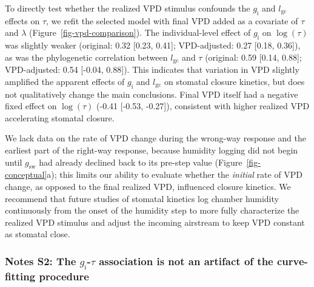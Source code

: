 \documentclass[
  letterpaper,
  DIV=11,
  numbers=noendperiod]{scrartcl}
\newcommand{\gcl}{$l_\mathrm{gc}$}
\newcommand{\gi}{$g_\mathrm{i}$}
\newcommand{\gsw}{$g_\mathrm{sw}$}
\begin{document}
To directly test whether the realized VPD stimulus confounds the \gi{}
and \gcl{} effects on \(\tau\), we refit the selected model with final
VPD added as a covariate of \(\tau\) and \(\lambda\)
(Figure~\ref{fig-vpd-comparison}). The individual-level effect of \gi{}
on \(\log \left( \tau \right)\) was slightly weaker (original: 0.32
{[}0.23, 0.41{]}; VPD-adjusted: 0.27 {[}0.18, 0.36{]}), as was the
phylogenetic correlation between \gcl{} and \(\tau\) (original: 0.59
{[}0.14, 0.88{]}; VPD-adjusted: 0.54 {[}-0.04, 0.88{]}). This indicates
that variation in VPD slightly amplified the apparent effects of \gi{}
and \gcl{} on stomatal closure kinetics, but does not qualitatively
change the main conclusions. Final VPD itself had a negative fixed
effect on \(\log \left( \tau \right)\) (-0.41 {[}-0.53, -0.27{]}),
consistent with higher realized VPD accelerating stomatal closure.

We lack data on the rate of VPD change during the wrong-way response and
the earliest part of the right-way response, because humidity logging
did not begin until \gsw{} had already declined back to its pre-step
value (Figure~\ref{fig-conceptual}a); this limits our ability to
evaluate whether the \emph{initial} rate of VPD change, as opposed to
the final realized VPD, influenced closure kinetics. We recommend that
future studies of stomatal kinetics log chamber humidity continuously
from the onset of the humidity step to more fully characterize the
realized VPD stimulus and adjust the incoming airstream to keep VPD
constant as stomatal close.

\newpage{}

\subsubsection{\texorpdfstring{Notes S2: The \gi{}-\(\tau\) association
is not an artifact of the curve-fitting
procedure}{Notes S2: The -\textbackslash tau association is not an artifact of the curve-fitting procedure}}\label{notes-s2-the--tau-association-is-not-an-artifact-of-the-curve-fitting-procedure}
\end{document}
